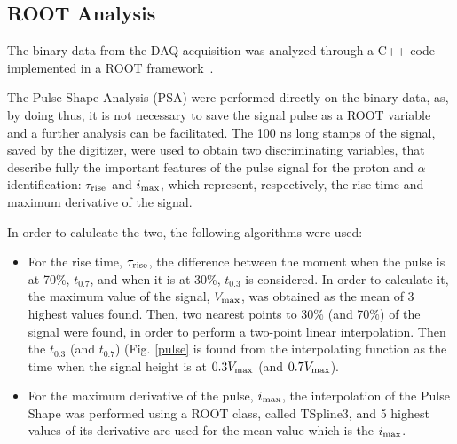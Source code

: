 \subsection{ROOT Analysis}

The binary data from the DAQ acquisition was analyzed through a C++ code
implemented in a ROOT framework~\cite{root}.

\bigbreak

The Pulse Shape Analysis (PSA) were performed directly on the binary data, as,
by doing thus, it is not necessary to save the signal pulse as a ROOT variable
and a further analysis can be facilitated. The \num{100} ns long stamps of the
signal, saved by the digitizer, were used to obtain two discriminating
variables, that describe fully the important features of the pulse signal for
the proton and $\alpha$ identification: $\tau _{\textup{rise}}$ and
$i_{\textup{max}}$, which represent, respectively, the rise time and maximum
derivative of the signal.

\bigbreak

In order to calulcate the two, the following algorithms were used:

\begin{itemize}

\item For the rise time, $\tau _{\textup{rise}}$, the difference between the moment when the pulse is at
  70\%, $t_{0.7}$, and when it is at 30\%, $t_{0.3}$ is considered.
  In order to calculate it, the maximum value of the signal, $V_{\textup{max}}$,
  was obtained as the mean of 3 highest values found. Then, two nearest points
  to 30\% (and 70\%) of the signal were found, in order to perform a two-point
  linear interpolation. Then the $t_{0.3}$ (and $t_{0.7}$) (Fig. \ref{pulse} is found from the
  interpolating function as the time when the signal height is at
  $0.3 V_{\textup{max}}$
  (and $0.7 V_{\textup{max}}$).
\item For the maximum derivative of the pulse, $i_{\textup{max}}$, 
  the interpolation of the Pulse Shape was performed using a ROOT class,
  called TSpline3, and 5 highest values of its derivative are used for the
  mean value which is the $i_{\textup{max}}$.

\end{itemize}

